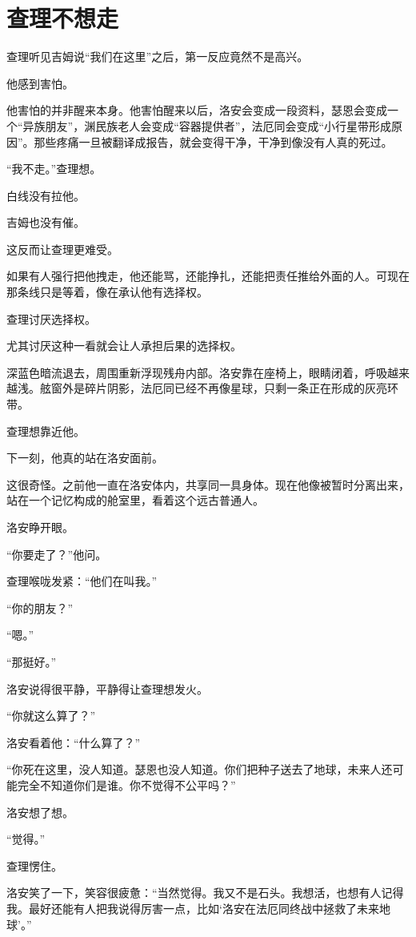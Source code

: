 \chapter{查理不想走}

查理听见吉姆说“我们在这里”之后，第一反应竟然不是高兴。

他感到害怕。

他害怕的并非醒来本身。他害怕醒来以后，洛安会变成一段资料，瑟恩会变成一个“异族朋友”，渊民族老人会变成“容器提供者”，法厄同会变成“小行星带形成原因”。那些疼痛一旦被翻译成报告，就会变得干净，干净到像没有人真的死过。

“我不走。”查理想。

白线没有拉他。

吉姆也没有催。

这反而让查理更难受。

如果有人强行把他拽走，他还能骂，还能挣扎，还能把责任推给外面的人。可现在那条线只是等着，像在承认他有选择权。

查理讨厌选择权。

尤其讨厌这种一看就会让人承担后果的选择权。

深蓝色暗流退去，周围重新浮现残舟内部。洛安靠在座椅上，眼睛闭着，呼吸越来越浅。舷窗外是碎片阴影，法厄同已经不再像星球，只剩一条正在形成的灰亮环带。

查理想靠近他。

下一刻，他真的站在洛安面前。

这很奇怪。之前他一直在洛安体内，共享同一具身体。现在他像被暂时分离出来，站在一个记忆构成的舱室里，看着这个远古普通人。

洛安睁开眼。

“你要走了？”他问。

查理喉咙发紧：“他们在叫我。”

“你的朋友？”

“嗯。”

“那挺好。”

洛安说得很平静，平静得让查理想发火。

“你就这么算了？”

洛安看着他：“什么算了？”

“你死在这里，没人知道。瑟恩也没人知道。你们把种子送去了地球，未来人还可能完全不知道你们是谁。你不觉得不公平吗？”

洛安想了想。

“觉得。”

查理愣住。

洛安笑了一下，笑容很疲惫：“当然觉得。我又不是石头。我想活，也想有人记得我。最好还能有人把我说得厉害一点，比如‘洛安在法厄同终战中拯救了未来地球’。”

